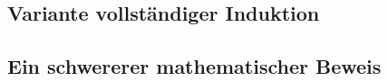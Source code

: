 \subsection{Variante vollständiger Induktion} %
\subsection{Ein schwererer mathematischer Beweis}


